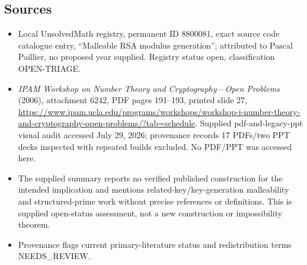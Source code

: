 \documentclass[11pt]{article}
\begin{document}
\subsection{Sources}
\begin{itemize}
\item Local UnsolvedMath registry, permanent ID 8800081, exact source code catalogue entry, ``Malleable RSA modulus generation''; attributed to Pascal Paillier, no proposed year supplied. Registry status open, classification OPEN-TRIAGE.
\item \emph{IPAM Workshop on Number Theory and Cryptography---Open Problems} (2006), attachment 6242, PDF pages 191--193, printed slide 27, \url{https://www.ipam.ucla.edu/programs/workshops/workshop-i-number-theory-and-cryptography-open-problems/?tab=schedule}. Supplied pdf-and-legacy-ppt visual audit accessed July 29, 2026; provenance records 17 PDFs/two PPT decks inspected with repeated builds excluded. No PDF/PPT was accessed here.
\item The supplied summary reports no verified published construction for the intended implication and mentions related-key/key-generation malleability and structured-prime work without precise references or definitions. This is supplied open-status assessment, not a new construction or impossibility theorem.
\item Provenance flags current primary-literature status and redistribution terms NEEDS\_REVIEW.
\end{itemize}
\end{document}
